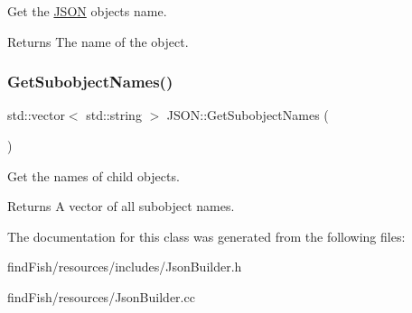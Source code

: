 Get the \mbox{\hyperlink{class_j_s_o_n}{J\+S\+ON}} object\textquotesingle{}s name. \begin{DoxyReturn}{Returns}
The name of the object. 
\end{DoxyReturn}
\mbox{\label{class_j_s_o_n_ac16428c04937871635332ed5352aa773}} 
\subsubsection{\texorpdfstring{GetSubobjectNames()}{GetSubobjectNames()}}
{\footnotesize\ttfamily std\+::vector$<$ std\+::string $>$ J\+S\+O\+N\+::\+Get\+Subobject\+Names (\begin{DoxyParamCaption}{ }\end{DoxyParamCaption})}

Get the names of child objects. \begin{DoxyReturn}{Returns}
A vector of all subobject names. 
\end{DoxyReturn}


The documentation for this class was generated from the following files\+:\begin{DoxyCompactItemize}
\item 
find\+Fish/resources/includes/Json\+Builder.\+h\item 
find\+Fish/resources/Json\+Builder.\+cc\end{DoxyCompactItemize}
